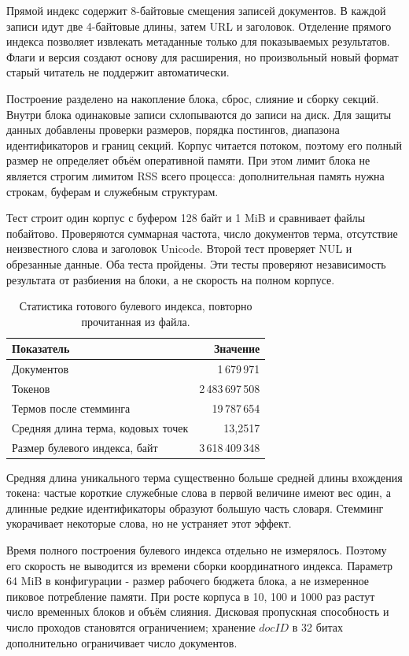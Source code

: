 Прямой индекс содержит 8-байтовые смещения записей документов.
В каждой записи идут две 4-байтовые длины, затем URL и заголовок.
Отделение прямого индекса позволяет извлекать метаданные только для
показываемых результатов. Флаги и версия создают основу для расширения,
но произвольный новый формат старый читатель не поддержит автоматически.

\journal
Построение разделено на накопление блока, сброс, слияние и сборку секций.
Внутри блока одинаковые записи схлопываются до записи на диск.
Для защиты данных добавлены проверки размеров, порядка постингов,
диапазона идентификаторов и границ секций. Корпус читается потоком,
поэтому его полный размер не определяет объём оперативной памяти.
При этом лимит блока не является строгим лимитом RSS всего процесса:
дополнительная память нужна строкам, буферам и служебным структурам.

\testing
Тест  строит один корпус с буфером
128 байт и 1 MiB и сравнивает файлы побайтово. Проверяются суммарная
частота, число документов терма, отсутствие неизвестного слова и
заголовок Unicode. Второй тест проверяет NUL и обрезанные данные.
Оба теста пройдены. Эти тесты проверяют независимость
результата от разбиения на блоки, а не скорость на полном корпусе.

\results
\begin{table}[H]\centering
\begin{tabular}{lr}\toprule
Показатель & Значение\\\midrule
Документов & 1\,679\,971\\
Токенов & 2\,483\,697\,508\\
Термов после стемминга & 19\,787\,654\\
Средняя длина терма, кодовых точек & 13,2517\\
Размер булевого индекса, байт & 3\,618\,409\,348\\\bottomrule
\end{tabular}
\caption{Статистика готового булевого индекса, повторно прочитанная из файла.}
\end{table}
Средняя длина уникального терма существенно больше средней длины
вхождения токена: частые короткие служебные слова в первой величине
имеют вес один, а длинные редкие идентификаторы образуют большую часть
словаря. Стемминг укорачивает некоторые слова, но не устраняет этот эффект.

Время полного построения булевого индекса отдельно не измерялось.
Поэтому его скорость не выводится из времени сборки координатного индекса.
Параметр 64 MiB в конфигурации - размер рабочего бюджета блока,
а не измеренное пиковое потребление памяти. При росте корпуса в 10,
100 и 1000 раз растут число временных блоков и объём слияния.
Дисковая пропускная способность и число проходов становятся ограничением;
хранение \(docID\) в 32 битах дополнительно ограничивает число документов.

